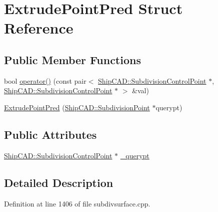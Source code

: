 \hypertarget{structExtrudePointPred}{\section{Extrude\-Point\-Pred Struct Reference}
\label{structExtrudePointPred}
}
\subsection*{Public Member Functions}
\begin{DoxyCompactItemize}
\item 
bool \hyperlink{structExtrudePointPred_ab8901a2a46f147e81c80c25b0492c772}{operator()} (const pair$<$ \hyperlink{classShipCAD_1_1SubdivisionControlPoint}{Ship\-C\-A\-D\-::\-Subdivision\-Control\-Point} $\ast$, \hyperlink{classShipCAD_1_1SubdivisionControlPoint}{Ship\-C\-A\-D\-::\-Subdivision\-Control\-Point} $\ast$ $>$ \&val)
\item 
\hyperlink{structExtrudePointPred_ac213b3b8d1bdc5a72e0a5a4ed53d9439}{Extrude\-Point\-Pred} (\hyperlink{classShipCAD_1_1SubdivisionPoint}{Ship\-C\-A\-D\-::\-Subdivision\-Point} $\ast$querypt)
\end{DoxyCompactItemize}
\subsection*{Public Attributes}
\begin{DoxyCompactItemize}
\item 
\hyperlink{classShipCAD_1_1SubdivisionControlPoint}{Ship\-C\-A\-D\-::\-Subdivision\-Control\-Point} $\ast$ \hyperlink{structExtrudePointPred_af9fa40238ef74aca6b8f8d7e303aafb4}{\-\_\-querypt}
\end{DoxyCompactItemize}


\subsection{Detailed Description}


Definition at line 1406 of file subdivsurface.\-cpp.



